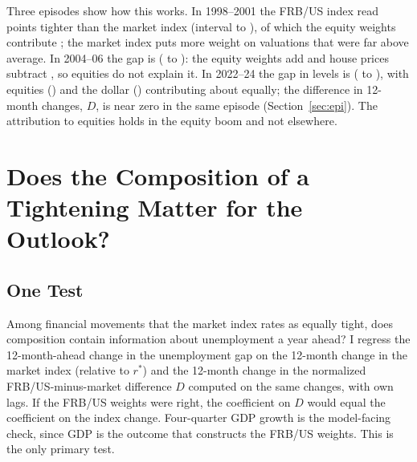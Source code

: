 \documentclass[11pt]{article}
\begin{document}
Three episodes show how this works. In 1998--2001 the FRB/US index read  points tighter than the market index (interval  to ), of which the equity weights contribute ; the market index puts more weight on valuations that were far above average. In 2004--06 the gap is  ( to ): the equity weights add  and house prices subtract , so equities do not explain it. In 2022--24 the gap in levels is  ( to ), with equities () and the dollar () contributing about equally; the difference in 12-month changes, $D$, is near zero in the same episode (Section~\ref{sec:epi}). The attribution to equities holds in the equity boom and not elsewhere.
\FloatBarrier

\section{Does the Composition of a Tightening Matter for the Outlook?}\label{sec:outlook}
\subsection{One Test}\label{sec:onetest}
Among financial movements that the market index rates as equally tight, does composition contain information about unemployment a year ahead? I regress the 12-month-ahead change in the unemployment gap on the 12-month change in the market index (relative to $r^*$) and the 12-month change in the normalized FRB/US-minus-market difference $D$ computed on the same changes, with own lags. If the FRB/US weights were right, the coefficient on $D$ would equal the coefficient on the index change. Four-quarter GDP growth is the model-facing check, since GDP is the outcome that constructs the FRB/US weights. This is the only primary test.
\end{document}
